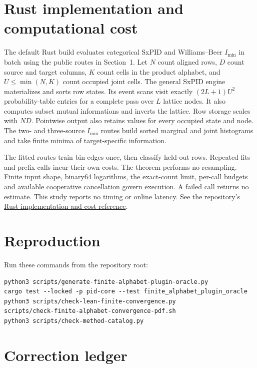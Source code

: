 \documentclass[11pt]{article}
\theoremstyle{definition}
\newcommand{\imin}{I_{\min}}
\begin{document}
\section{Rust implementation and computational cost}

The default Rust build evaluates categorical SxPID and Williams--Beer $\imin$ in batch using
the public routes in Section~1.  Let $N$ count aligned rows, $D$ count source and target columns,
$K$ count cells in the product alphabet, and $U\le\min(N,K)$ count occupied joint cells.
The general SxPID engine materializes and sorts row states. Its event scans visit exactly
$(2L+1)U^2$ probability-table entries for a complete pass over $L$ lattice nodes.
It also computes subset mutual informations and inverts the lattice.  Row storage scales
with $ND$.  Pointwise output also retains values for every occupied state and node.
The two- and three-source $\imin$ routes build sorted marginal and joint histograms and
take finite minima of target-specific information.

The fitted routes train bin edges once, then classify held-out rows.  Repeated fits and prefix
calls incur their own costs.  The theorem performs no resampling.  Finite input shape, binary64
logarithms, the exact-count limit, per-call budgets and available cooperative cancellation govern
execution.  A failed call returns no estimate.  This study reports no timing or online latency.
See the repository's \href{https://github.com/sepahead/pid-rs/blob/main/RUST_IMPLEMENTATION_AND_COST.md}{Rust implementation and cost reference}.

\section{Reproduction}

Run these commands from the repository root:
\begin{verbatim}
python3 scripts/generate-finite-alphabet-plugin-oracle.py
cargo test --locked -p pid-core --test finite_alphabet_plugin_oracle
python3 scripts/check-lean-finite-convergence.py
scripts/check-finite-alphabet-convergence-pdf.sh
python3 scripts/check-method-catalog.py
\end{verbatim}

\section{Correction ledger}
\end{document}
